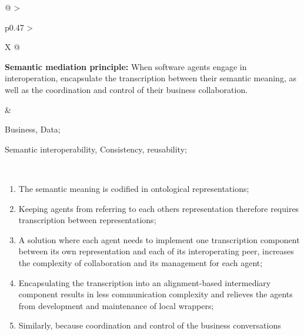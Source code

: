 \begin{xltabular}[l]{\linewidth}{@{} >{\small\raggedright\arraybackslash}p{0.47\linewidth} >{\small\raggedright\arraybackslash}X @{}}
%
%
%
\begin{mmdp}\label{dp:mediation}{\bfseries Semantic mediation principle:}
\quad When software agents engage in interoperation, encapsulate the transcription between their semantic meaning, as well as the coordination and control of their business collaboration.\end{mmdp}
&
\begin{description}[labelwidth=3.7cm,leftmargin=3.7cm+1ex,nosep,topsep=2ex,labelsep=1ex,font=\bfseries]
\item[Type of information:] Business, Data;
\item[Quality attributes:] Semantic interoperability, Consistency, reusability;
\end{description} \\
\begin{enumerate}[left=6pt, nosep]
  \item The semantic meaning is codified in ontological representations;
  \item Keeping agents from referring to each others representation therefore requires transcription between representations;
  \item A solution where each agent needs to implement one transcription component between its own representation and each of its interoperating peer, increases the complexity of collaboration and its management for each agent;
  \item Encapsulating the transcription into an alignment-based intermediary component results in less communication complexity and relieves the agents from development and maintenance of local wrappers;
  \item Similarly, because coordination and control of the business conversations

\end{enumerate}
\end{xltabular}
